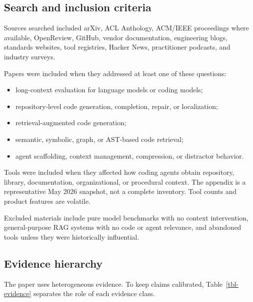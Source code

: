 \documentclass[
  11pt,
  letterpaper,
  numbers=noendperiod,
  parskip=half]{scrartcl}
\providecommand{\tightlist}{%
  \setlength{\itemsep}{0pt}\setlength{\parskip}{0pt}}
\begin{document}
\subsection{Search and inclusion criteria}\label{sec-method-search}

Sources searched included arXiv, ACL Anthology, ACM/IEEE proceedings
where available, OpenReview, GitHub, vendor documentation, engineering
blogs, standards websites, tool registries, Hacker News, practitioner
podcasts, and industry surveys.

Papers were included when they addressed at least one of these
questions:

\begin{itemize}
\tightlist
\item
  long-context evaluation for language models or coding models;
\item
  repository-level code generation, completion, repair, or localization;
\item
  retrieval-augmented code generation;
\item
  semantic, symbolic, graph, or AST-based code retrieval;
\item
  agent scaffolding, context management, compression, or distractor
  behavior.
\end{itemize}

Tools were included when they affected how coding agents obtain
repository, library, documentation, organizational, or procedural
context. The appendix is a representative May 2026 snapshot, not a
complete inventory. Tool counts and product features are volatile.

Excluded materials include pure model benchmarks with no context
intervention, general-purpose RAG systems with no code or agent
relevance, and abandoned tools unless they were historically
influential.

\subsection{Evidence hierarchy}\label{sec-evidence-hierarchy}

The paper uses heterogeneous evidence. To keep claims calibrated,
Table~\ref{tbl-evidence} separates the role of each evidence class.
\end{document}
